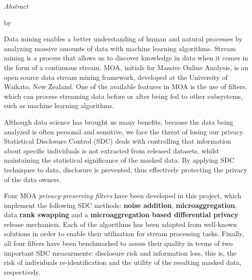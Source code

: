 
\thispagestyle{plain}
\null\vfil
\begin{center}
	\setlength{\parskip}{0pt}
	{\huge{\textit{Abstract}} \par}
	\bigskip
	{\Large\bf \ttitle \par} %
	\medskip
	{\normalsize by \authornames \par} %
\end{center}

Data mining enables a better understanding of human and natural processes by analyzing massive amounts of data with machine learning algorithms. Stream mining is a process that allows us to discover knowledge in data when it comes in the form of a continuous stream. MOA, initials for Massive Online Analysis, is an open source data stream mining framework, developed at the University of Waikato, New Zealand. One of the available features in MOA is the use of filters, which can process streaming data before or after being fed to other subsystems, such as machine learning algorithms.

Although data science has brought us many benefits, because the data being analyzed is often personal and sensitive, we face the threat of losing our privacy. Statistical Disclosure Control (SDC) deals with controlling that information about specific individuals is not extracted from released datasets, whilst maintaining the statistical significance of the masked data. By applying SDC techniques to data, disclosure is prevented, thus effectively protecting the privacy of the data owners.

Four MOA \textit{privacy-preserving filters} have been developed in this project, which implement the following SDC methods: \textbf{noise addition}, \textbf{microaggregation}, data \textbf{rank swapping} and a \textbf{microaggregation based differential privacy} release mechanism. Each of the algorithms has been adapted from well-known solutions in order to enable their utilization for stream processing tasks. Finally, all four filters have been benchmarked to assess their quality in terms of two important SDC measurments: disclosure risk and information loss, this is, the risk of individuals re-identification and the utility of the resulting masked data, respectively.

